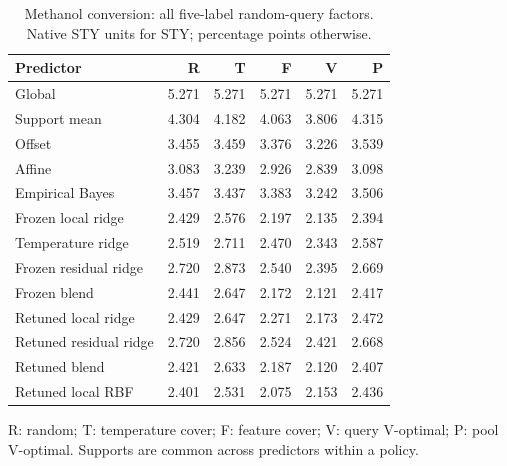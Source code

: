 \begin{table}[htbp]\centering\small
\caption{Methanol conversion: all five-label random-query factors. Native STY units for STY; percentage points otherwise.}
\begin{tabular}{lrrrrr}\toprule Predictor & R & T & F & V & P\\\midrule
Global & 5.271 & 5.271 & 5.271 & 5.271 & 5.271\\
Support mean & 4.304 & 4.182 & 4.063 & 3.806 & 4.315\\
Offset & 3.455 & 3.459 & 3.376 & 3.226 & 3.539\\
Affine & 3.083 & 3.239 & 2.926 & 2.839 & 3.098\\
Empirical Bayes & 3.457 & 3.437 & 3.383 & 3.242 & 3.506\\
Frozen local ridge & 2.429 & 2.576 & 2.197 & 2.135 & 2.394\\
Temperature ridge & 2.519 & 2.711 & 2.470 & 2.343 & 2.587\\
Frozen residual ridge & 2.720 & 2.873 & 2.540 & 2.395 & 2.669\\
Frozen blend & 2.441 & 2.647 & 2.172 & 2.121 & 2.417\\
Retuned local ridge & 2.429 & 2.647 & 2.271 & 2.173 & 2.472\\
Retuned residual ridge & 2.720 & 2.856 & 2.524 & 2.421 & 2.668\\
Retuned blend & 2.421 & 2.633 & 2.187 & 2.120 & 2.407\\
Retuned local RBF & 2.401 & 2.531 & 2.075 & 2.153 & 2.436\\
\bottomrule\end{tabular}\par\smallskip\footnotesize R: random; T: temperature cover; F: feature cover; V: query V-optimal; P: pool V-optimal. Supports are common across predictors within a policy.\end{table}\FloatBarrier
